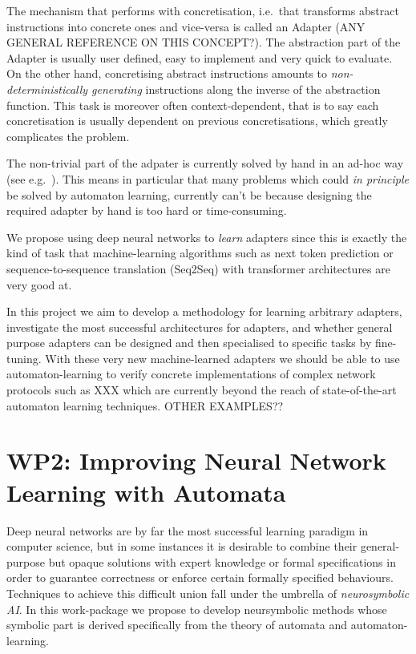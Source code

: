 \documentclass[11pt,a4paper]{article}
\begin{document}
		The mechanism that performs with concretisation, i.e.\ that transforms abstract instructions into concrete ones and vice-versa is called an Adapter \cite{ferreira2021prognosis} (ANY GENERAL REFERENCE ON THIS CONCEPT?). The abstraction part of the Adapter is usually user defined, easy to implement and very quick to evaluate. On the other hand, concretising abstract instructions amounts to \emph{non-deterministically generating} instructions along the inverse of the abstraction function. This task is moreover often context-dependent, that is to say each concretisation is usually dependent on previous concretisations, which greatly complicates the problem. 
		
		The non-trivial part of the adpater is currently solved by hand in an ad-hoc way (see e.g.\ \cite{ferreira2021prognosis}). This means in particular that many problems which could \emph{in principle} be solved by automaton learning, currently can't be because designing the required adapter by hand is too hard or time-consuming.
		
		We propose using deep neural networks to \emph{learn} adapters since this is exactly the kind of task that machine-learning algorithms such as next token prediction or sequence-to-sequence translation (Seq2Seq) with transformer architectures are very good at. 
		
		In this project we aim to develop a methodology for learning arbitrary adapters, investigate the most successful architectures for adapters, and whether general purpose adapters can be designed and then specialised to specific tasks by fine-tuning. With these very new machine-learned adapters we should be able to use automaton-learning to verify concrete implementations of complex network protocols such as XXX which are currently beyond the reach of state-of-the-art automaton learning techniques. OTHER EXAMPLES??
		
		
	\section*{WP2: Improving Neural Network Learning with Automata}
	Deep neural networks are by far the most successful learning paradigm in computer science, but in some instances it is desirable to combine their general-purpose but opaque solutions with expert knowledge or formal specifications in order to guarantee correctness or enforce certain formally specified behaviours. Techniques to achieve this difficult union fall under the umbrella of \emph{neurosymbolic AI}. In this work-package we propose to develop neursymbolic methods whose symbolic part is derived specifically from the theory of automata and automaton-learning.
	
\end{document}
